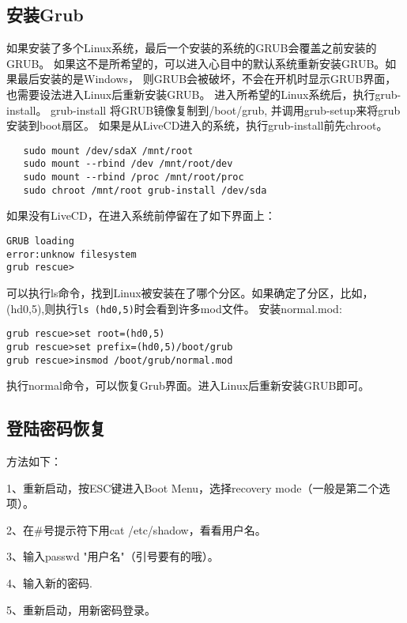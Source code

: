 \subsection{安装Grub}
如果安装了多个Linux系统，最后一个安装的系统的GRUB会覆盖之前安装的GRUB。
如果这不是所希望的，可以进入心目中的默认系统重新安装GRUB。如果最后安装的是Windows，
则GRUB会被破坏，不会在开机时显示GRUB界面，也需要设法进入Linux后重新安装GRUB。
进入所希望的Linux系统后，执行grub-install。
 grub-install 将GRUB镜像复制到/boot/grub, 并调用grub-setup来将grub安装到boot扇区。
 如果是从LiveCD进入的系统，执行grub-install前先chroot。
 \begin{verbatim}
   sudo mount /dev/sdaX /mnt/root
   sudo mount --rbind /dev /mnt/root/dev
   sudo mount --rbind /proc /mnt/root/proc
   sudo chroot /mnt/root grub-install /dev/sda
 \end{verbatim}
 
 
如果没有LiveCD，在进入系统前停留在了如下界面上：
\begin{verbatim}
GRUB loading
error:unknow filesystem
grub rescue>
\end{verbatim}
可以执行ls命令，找到Linux被安装在了哪个分区。如果确定了分区，比如，(hd0,5),则执行\verb+ls (hd0,5)+时会看到许多mod文件。
安装normal.mod:
\begin{verbatim}
grub rescue>set root=(hd0,5)
grub rescue>set prefix=(hd0,5)/boot/grub
grub rescue>insmod /boot/grub/normal.mod
\end{verbatim}
执行normal命令，可以恢复Grub界面。进入Linux后重新安装GRUB即可。


\subsection{登陆密码恢复}
方法如下：

1、重新启动，按ESC键进入Boot Menu，选择recovery mode（一般是第二个选项）。

2、在\#号提示符下用cat /etc/shadow，看看用户名。

3、输入passwd "用户名"（引号要有的哦）。

4、输入新的密码.

5、重新启动，用新密码登录。 






